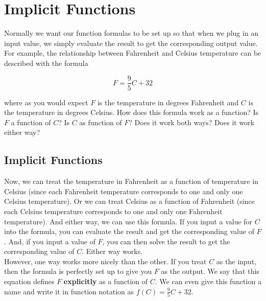 %
%

\section{Implicit Functions}
\label{ImplicitFunctions}

Normally we want our function formulas to be set up so that when we plug in an input value, we simply evaluate the result to get the corresponding output value. For example, the relationship between Fahrenheit and Celsius temperature can be described with the formula

\begin{equation*}
	F=\frac{9}{5}C+32
\end{equation*}

where as you would expect $F$ is the temperature in degrees Fahrenheit and $C$ is the temperature in degrees Celsius. How does this formula work as a function? Is $F$ a function of $C$? Is $C$ as function of $F$? Does it work both ways? Does it work either way?

%
%

\subsection{Implicit Functions}

Now, we can treat the temperature in Fahrenheit as a function of temperature in Celsius (since each Fahrenheit temperature corresponds to one and only one Celsius temperature). Or we can treat Celsius as a function of Fahrenheit (since each Celsius temperature corresponds to one and only one Fahrenheit temperature). And either way, we can use this formula. If you input a value for $C$ into the formula, you can evaluate the result and get the corresponding value of $F$. And, if you input a value of $F$, you can then solve the result to get the corresponding value of $C$. Either way works.\\

However, one way works more nicely than the other. If you treat $C$ as the input, then the formula is perfectly set up to give you $F$ as the output. We say that this equation defines $F$ \textbf{explicitly} as a function of $C$. We can even give this function a name and write it in function notation as $f(C)=\frac{9}{5}C+32$.\\

